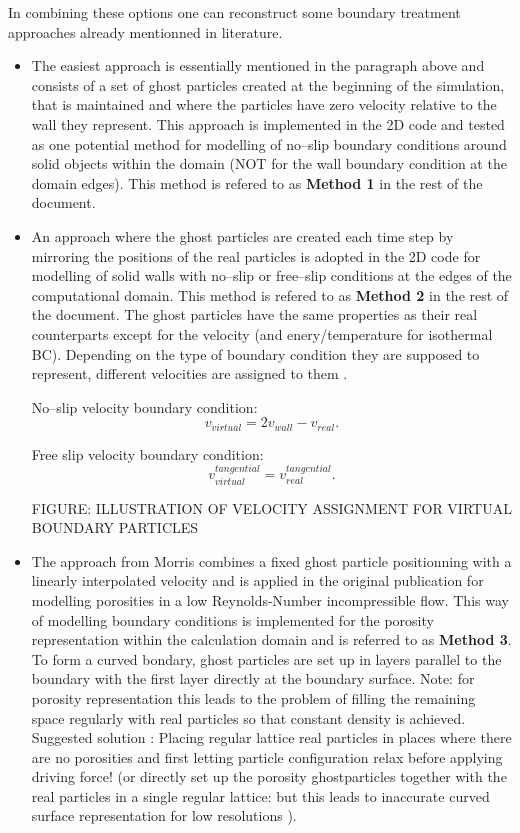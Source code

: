 \documentclass{report}
\begin{document}
In combining these options one can reconstruct some boundary treatment approaches already mentionned in literature.
\begin{itemize}
\item The easiest approach is essentially mentioned in the paragraph above and consists of a set of ghost particles created at the beginning of the simulation, that is maintained and where the particles have zero velocity relative to the wall they represent. This approach is implemented in the 2D code and tested as one potential method for modelling of no--slip boundary conditions around solid objects within the domain (NOT for the wall boundary condition at the domain edges). This method is refered to as {\bf Method 1} in the rest of the document.

 \item An approach where the ghost particles are created each time step by mirroring the positions of the real particles is adopted in the 2D code for modelling of solid walls with no--slip or free--slip conditions at the edges of the computational domain. This method is refered to as {\bf Method 2} in the rest of the document.
The ghost particles have the same properties as their real counterparts
except for the velocity (and enery/temperature for isothermal BC). Depending on the type of boundary condition they are
supposed to represent, different velocities are assigned to them \cite{Hu2006}.

No--slip velocity boundary condition:
\begin{equation}
v_{virtual}=2v_{wall}-v_{real}.
\end{equation}

Free slip velocity boundary condition:
\begin{equation}
v_{virtual}^{tangential}=v_{real}^{tangential}.
\end{equation}

FIGURE: ILLUSTRATION OF VELOCITY ASSIGNMENT FOR VIRTUAL BOUNDARY PARTICLES

\item The approach from Morris \cite{Zhu1999} combines a fixed ghost particle positionning with a linearly interpolated velocity and is applied in the original publication for modelling porosities in a low Reynolds-Number incompressible flow.
This way of modelling boundary conditions is implemented for the porosity representation within the calculation domain and is referred to as {\bf Method 3}.
To form a curved bondary, ghost particles are set up in layers parallel to the boundary with the first layer directly at the boundary surface. 
Note: for porosity representation this leads to the problem of filling the remaining space regularly with real particles so that constant density is achieved. Suggested solution \cite{Morris1997}: Placing regular lattice real particles in places where there are no porosities and first letting particle configuration relax before applying driving force! (or directly set up the porosity ghostparticles together with the real particles in a single regular lattice: but this leads to inaccurate curved surface representation for low resolutions \cite{Morris1997}).


\end{itemize}
\end{document}
